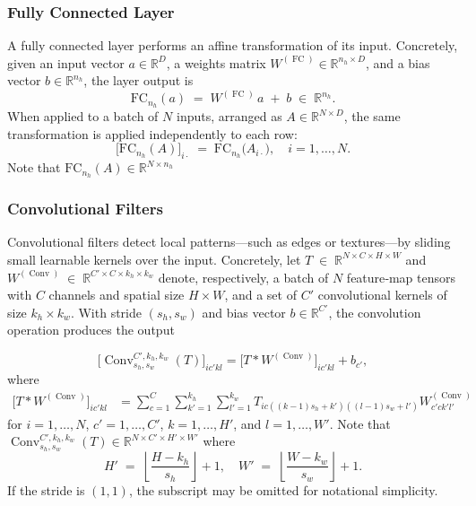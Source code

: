 \documentclass[10pt,a4paper,oneside]{article}
\newcommand{\R}{\mathbb{R}}
\DeclareMathOperator{\fullyconnected}{FC}
\DeclareMathOperator{\convolution}{Conv}
\begin{document}
\subsubsection{Fully Connected Layer}

A fully connected layer performs an affine transformation of its input.  Concretely, given an input vector 
$a \in \mathbb{R}^D$, a weights matrix $W^{(\fullyconnected)}\in \mathbb{R}^{n_h \times D}$, and a bias vector $b \in \mathbb{R}^{n_h}$, the layer output is
\[
\mathrm{FC}_{n_h}(a) \;=\; W^{(\fullyconnected)}\,a \;+\; b
\;\in\; \mathbb{R}^{n_h}.
\]
When applied to a batch of \(N\) inputs, arranged as $A \in \mathbb{R}^{N \times D}$, the same transformation is applied independently to each row:
\[
\bigl[\mathrm{FC}_{n_h}(A)\bigr]_{i \cdot}
\;=\;
\mathrm{FC}_{n_h}\bigl(A_{i \cdot}\bigr),
\quad
i = 1,\dots,N.
\]
Note that $\mathrm{FC}_{n_h}(A) \in \R^{N \times n_h}$

\subsubsection{Convolutional Filters}

Convolutional filters detect local patterns—such as edges or textures—by sliding small learnable kernels over the input.  Concretely, let $T \;\in\; \mathbb{R}^{N \times C \times H \times W}$ and $W^{(\convolution)} \;\in\; \mathbb{R}^{C' \times C \times k_h \times k_w}$ denote, respectively, a batch of \(N\) feature‐map tensors with \(C\) channels and spatial size \(H\times W\), and a set of \(C'\) convolutional kernels of size \(k_h\times k_w\).  With stride \((s_h,s_w)\) and bias vector \(b\in\mathbb{R}^{C'}\), the convolution operation produces the output

$$
\bigl[\convolution^{C', k_h, k_w}_{s_h, s_w}(T)\bigr]_{ic'kl} = \bigl[T * W^{(\convolution)}\bigr]_{ic'kl} + b_{c'},
$$
where
\begin{align*}
    \bigr[T * W^{(\convolution)}\bigl]_{ic'kl} &= \sum^{C}_{c = 1} \sum^{k_h}_{k' = 1} \sum^{k_w}_{l' = 1} T_{ic((k - 1)s_h + k')((l - 1)s_w + l')} W^{(\convolution)}_{c' c k' l'}
\end{align*}
for \(i=1,\dots,N\), \(c'=1,\dots,C'\), \(k=1,\dots,H'\), and \(l=1,\dots,W'\). Note that $\convolution^{C', k_h, k_w}_{s_h, s_w}(T) \in \R^{N \times C' \times H' \times W'}$ where
\[
H' \;=\;\left\lfloor\frac{H - k_h}{s_h}\right\rfloor + 1,
\quad
W' \;=\;\left\lfloor\frac{W - k_w}{s_w}\right\rfloor + 1.
\]
If the stride is \((1,1)\), the subscript may be omitted for notational simplicity.  
\end{document}
